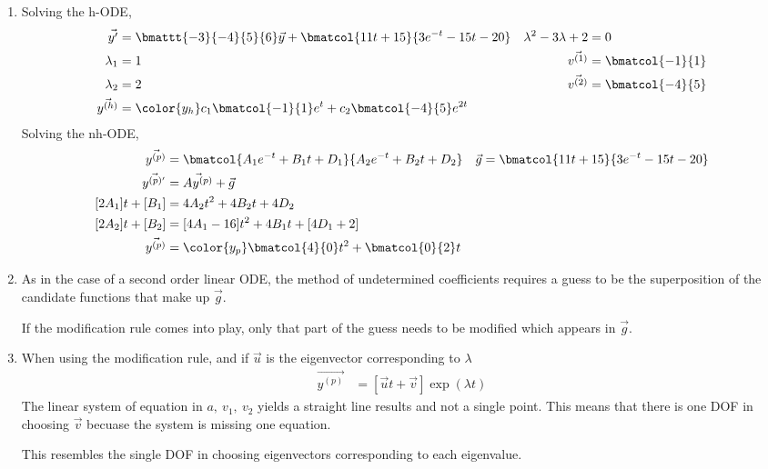 \begin{enumerate}
    \item Solving the h-ODE,
          \begin{align}
              \vec{y'}                   & = \bmattt{-3}{-4}{5}{6} \vec{y}
              + \bmatcol{11t + 15}
              {3e^{-t} -15t - 20}        &
              \lambda^{2} - 3\lambda + 2 & = 0                               \\
              \lambda_1                  & = 1                             &
              \vec{v^{(1)}}              & = \bmatcol{-1}{1}                 \\
              \lambda_2                  & = 2                             &
              \vec{v^{(2)}}              & = \bmatcol{-4}{5}                 \\
              \vec{y^{(h)}}              & = \color{y_h}
              c_1 \bmatcol{-1}{1}e^{t} + c_2 \bmatcol{-4}{5} e^{2t}
          \end{align}
          Solving the nh-ODE,
          \begin{align}
              \vec{y^{(p)}}              & = \bmatcol{A_1 e^{-t} + B_1 t + D_1}
              {A_2 e^{-t} + B_2 t + D_2} &
              \vec{g}                    & = \bmatcol{11t + 15}
              {3e^{-t} -15t - 20}                                               \\
              \vec{y^{(p)'}}             & = \vec{Ay^{(p)}} + \vec{g}           \\
              [2A_1]t + [B_1]            & = 4A_2 t^2 + 4B_2 t + 4D_2           \\
              [2A_2]t + [B_2]            & = [4A_1 - 16]t^2 + 4B_1 t
              + [4D_1 + 2]                                                      \\
              \vec{y^{(p)}}              & = \color{y_p} \bmatcol{4}{0}t^2
              + \bmatcol{0}{2}t
          \end{align}

    \item As in the case of a second order linear ODE, the method of undetermined
          coefficients requires a guess to be the superposition of the candidate
          functions that make up $ \vec{g} $. \par
          If the modification rule comes into play, only that part of the guess needs
          to be modified which appears in $ \vec{g} $.

    \item When using the modification rule, and if $ \vec{u} $ is the eigenvector
          corresponding to $ \lambda $
          \begin{align}
              \vec{y^{(p)}} & = [\vec{u}t + \vec{v}] \exp(\lambda t)
          \end{align}
          The linear system of equation in $ a,\ v_1,\ v_2 $ yields a straight line
          results and not a single point. This means that there is one DOF in
          choosing $ \vec{v} $ becuase the system is missing one equation. \par
          This resembles the single DOF in choosing eigenvectors corresponding
          to each eigenvalue.


\end{enumerate}

